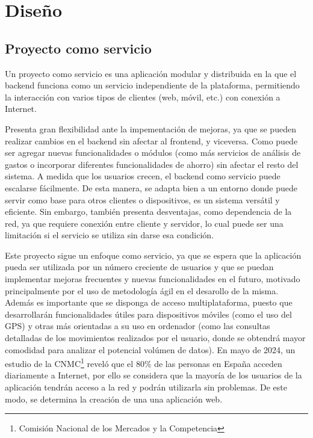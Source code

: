 \chapter{Diseño}\label{chap:diseno}

\section{Proyecto como servicio}
Un proyecto como servicio es una aplicación modular y distribuida en la que el backend funciona como un servicio independiente de la plataforma, permitiendo la interacción con varios tipos de clientes (web, móvil, etc.) con conexión a Internet. 

Presenta gran flexibilidad ante la impementación de mejoras, ya que se pueden realizar cambios en el backend sin afectar al frontend, y viceversa. Como puede ser agregar nuevas funcionalidades o módulos (como más servicios de análisis de gastos o incorporar diferentes funcionalidades de ahorro) sin afectar el resto del sistema. A medida que los usuarios crecen, el backend como servicio puede escalarse fácilmente. De esta manera, se adapta bien a un entorno donde puede servir como base para otros clientes o dispositivos, es un sistema versátil y eficiente. Sin embargo, también presenta desventajas, como dependencia de la red, ya que requiere conexión entre cliente y servidor, lo cual puede ser una limitación si el servicio se utiliza sin darse esa condición\cite{galster2014variability}.

Este proyecto sigue un enfoque como servicio, ya que se espera que la aplicación pueda ser utilizada por un número creciente de usuarios y que se puedan implementar mejoras frecuentes y nuevas funcionalidades en el futuro, motivado principalmente por el uso de metodología ágil en el desarollo de la misma. Además es importante que se disponga de acceso multiplataforma, puesto que desarrollarán funcionalidades útiles para dispositivos móviles (como el uso del GPS) y otras más orientadas a su uso en ordenador (como las consultas detalladas de los movimientos realizados por el usuario, donde se obtendrá mayor comodidad para analizar el potencial volúmen de datos). En mayo de 2024, un estudio de la CNMC\footnote{Comisión Nacional de los Mercados y la Competencia} reveló que el 80\% de las personas en España acceden diariamente a Internet, por ello se considera que la mayoría de los usuarios de la aplicación tendrán acceso a la red y podrán utilizarla sin problemas\cite{cnmc2024}. 
De este modo, se determina la creación de una una aplicación web.

